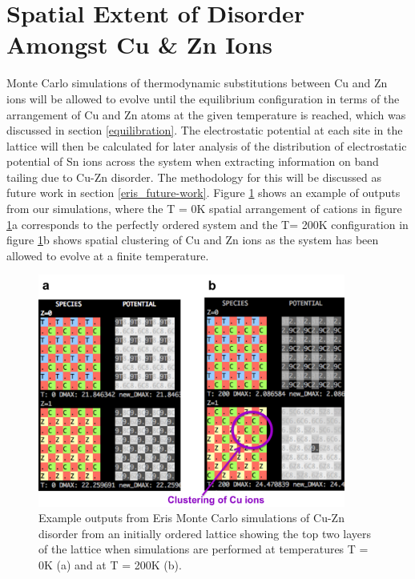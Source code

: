 \section{Spatial Extent of Disorder Amongst Cu \& Zn Ions}
Monte Carlo simulations of thermodynamic substitutions between Cu and Zn ions  will be allowed to evolve until the equilibrium configuration in terms of the arrangement of Cu and Zn atoms at the given temperature is reached, which was discussed in section \ref{equilibration}. The electrostatic potential at each site in the lattice will then be calculated for later analysis of the distribution of electrostatic potential of Sn ions across the system when extracting information on band tailing due to Cu-Zn disorder. The methodology for this will be discussed as future work in section \ref{eris_future-work}. Figure \ref{eris_spatial_disorder} shows an example of outputs from our simulations, where the T = 0K spatial arrangement of cations in figure \ref{eris_spatial_disorder}a corresponds to the perfectly ordered system and the T= 200K configuration in figure \ref{eris_spatial_disorder}b shows spatial clustering of Cu and Zn ions as the system has been allowed to evolve at a finite temperature.

\begin{figure}[h!]
  \centering
    \includegraphics[width=0.9\textwidth]{figures/eris_spatial_disorder.png}
    \caption{Example outputs from Eris Monte Carlo simulations of Cu-Zn disorder from an initially ordered lattice showing the top two layers of the lattice when simulations are performed at temperatures T = 0K (a) and at T = 200K (b).}
  \label{eris_spatial_disorder}
\end{figure}

